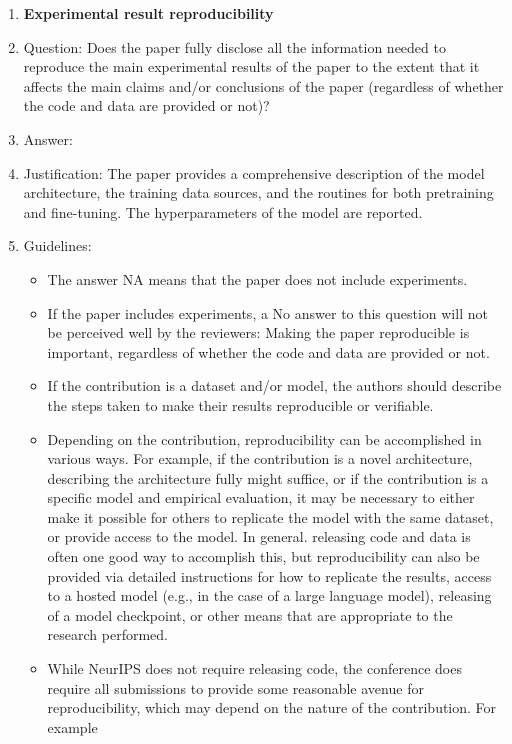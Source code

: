 \documentclass{article}
\begin{document}
\begin{enumerate}
    \item {\bf Experimental result reproducibility}
    \item[] Question: Does the paper fully disclose all the information needed to reproduce the main experimental results of the paper to the extent that it affects the main claims and/or conclusions of the paper (regardless of whether the code and data are provided or not)?
    \item[] Answer: \answerYes{} %
    \item[] Justification: The paper provides a comprehensive description of the model architecture, the training data sources, and the routines for both pretraining and fine-tuning. The hyperparameters of the model are reported.
    \item[] Guidelines:
    \begin{itemize}
        \item The answer NA means that the paper does not include experiments.
        \item If the paper includes experiments, a No answer to this question will not be perceived well by the reviewers: Making the paper reproducible is important, regardless of whether the code and data are provided or not.
        \item If the contribution is a dataset and/or model, the authors should describe the steps taken to make their results reproducible or verifiable. 
        \item Depending on the contribution, reproducibility can be accomplished in various ways. For example, if the contribution is a novel architecture, describing the architecture fully might suffice, or if the contribution is a specific model and empirical evaluation, it may be necessary to either make it possible for others to replicate the model with the same dataset, or provide access to the model. In general. releasing code and data is often one good way to accomplish this, but reproducibility can also be provided via detailed instructions for how to replicate the results, access to a hosted model (e.g., in the case of a large language model), releasing of a model checkpoint, or other means that are appropriate to the research performed.
        \item While NeurIPS does not require releasing code, the conference does require all submissions to provide some reasonable avenue for reproducibility, which may depend on the nature of the contribution. For example
        \begin{enumerate}

\end{enumerate}
\end{itemize}
\end{enumerate}
\end{document}
